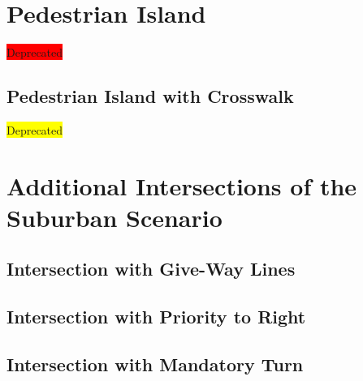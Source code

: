 \section{Pedestrian Island}
\colorbox{red}{\large Deprecated}
\begin{figure}[H]
	\begin{center}
		\centering
	\end{center}
\end{figure}
\newpage

\subsection{Pedestrian Island with Crosswalk}
\colorbox{yellow}{\large Deprecated}
\begin{figure}[H]
	\begin{center}
		\centering
	\end{center}
\end{figure}

\section{Additional Intersections of the Suburban Scenario}
\label{additional_intersections}

\subsection{Intersection with Give-Way Lines}
\label{fig_intersection_give_way_lines}
\begin{figure}[H]
	\begin{center}
		\centering
	\end{center}
\end{figure}

\subsection{Intersection with Priority to Right}
\label{fig_intersection_priority}
\begin{figure}[H]
	\begin{center}
		\centering
	\end{center}
\end{figure}

\subsection{Intersection with Mandatory Turn}
\label{fig_intersection_mandatory}
